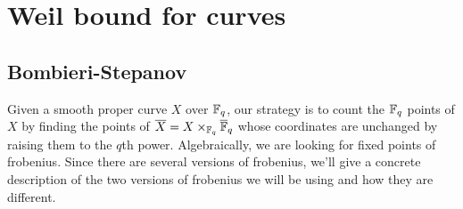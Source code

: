 \begin{comment}
\subsection{References}
\renewcommand{\refname}{General background of zeta function for varieties over $\FF_p$}
\begin{thebibliography}{3}
\bibitem{katz}
Nick Katz, 
\textit{Lecture Notes at Princeton 1973-1974}

\bibitem{raskin}
Sam Raskin, 
\textit{UChicago REU 07 notes}

\bibitem{mustata}
Mustata,
\textit{Zeta Functions in Algebraic Geometry}
\end{thebibliography}
\renewcommand{\refname}{Weil II}
\begin{thebibliography}{2}
\bibitem{katz-weilII}
Nick Katz,
\textit{Four Lectures on Weil II}

\bibitem{michel}
Michel,
\textit{Diophantine Consequences of Deligne's Weil II Main Theorem},
\url{http://wiki.epfl.ch/quantumchaos2013/documents/PhMichel_SeminarTamas.pdf}
\end{thebibliography}
\renewcommand{\refname}{Dwork's proof of rationality}
\begin{thebibliography}{1}
\bibitem{tao}
Terry Tao,
\textit{Blog post on Dwork's proof},
\url{https://terrytao.wordpress.com/2014/05/13/dworks-proof-of-rationality-of-the-zeta-function-over-finite-fields/}
\end{thebibliography}
\end{comment}


\section{Weil bound for curves}

\subsection{Bombieri-Stepanov}

Given a smooth proper curve $X$ over $\mathbb{F}_q$, our strategy is to count the $\mathbb{F}_q$ points of $X$ by finding the points of $\overline{X} = X\times_{\mathbb{F}_q} \overline{\mathbb{F}}_q$ whose coordinates are unchanged by raising them to the $q$th power. Algebraically, we are looking for fixed points of frobenius. Since there are several versions of frobenius, we'll give a concrete description of the two versions of frobenius we will be using and how they are different.

